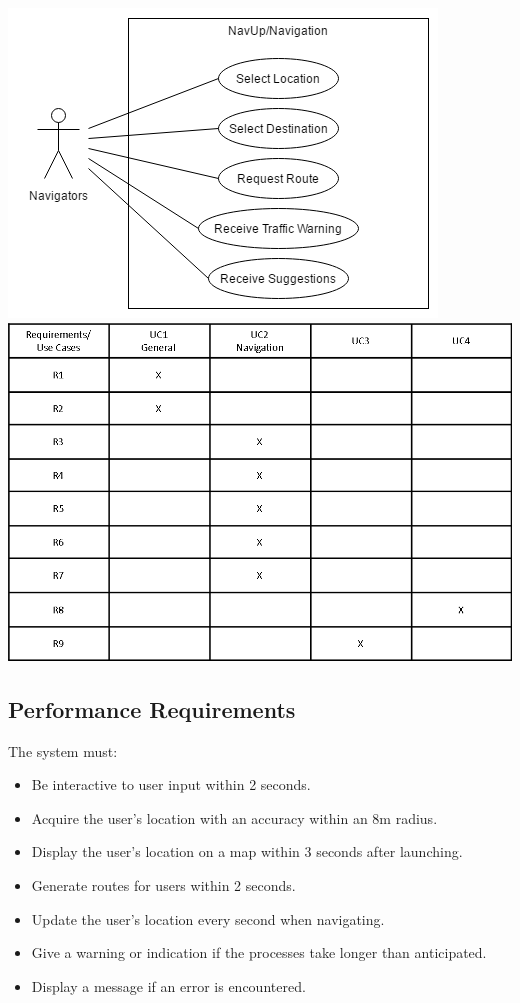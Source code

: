\documentclass[english]{article}
\begin{document}
					   \includegraphics{NavUp_Navigation.png}		   \includegraphics{Traceability_Matrix.png}

				\subsection{Performance Requirements}
    				The system must:
    				\begin{itemize}
        				\item Be interactive to user input within 2 seconds.
        				\item Acquire the user's location with an accuracy within an 8m radius.
        				\item Display the user's location on a map within 3 seconds after launching.
        				\item Generate routes for users within 2 seconds.
        				\item Update the user's location every second when navigating.
        				\item Give a warning or indication if the processes take longer than anticipated.
        				\item Display a message if an error is encountered.
    				\end{itemize}
\end{document}
